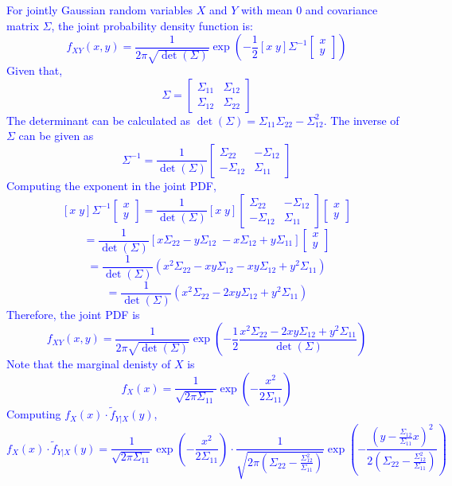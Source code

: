 \documentclass{article}
\begin{document}
\begin{enumerate}
    \textcolor{blue}{
        For jointly Gaussian random variables $X$ and $Y$ with mean 0 and covariance matrix $\Sigma$, the joint probability density function is:
$$f_{XY}(x,y) = \frac{1}{2\pi\sqrt{\det(\Sigma)}}\exp\left(-\frac{1}{2}[x \; y]\Sigma^{-1}\begin{bmatrix} x \\ y \end{bmatrix}\right)$$
Given that,
$$\Sigma = \begin{bmatrix} \Sigma_{11} & \Sigma_{12} \\ \Sigma_{12} & \Sigma_{22} \end{bmatrix}$$
The determinant can be calculated as $\det(\Sigma) = \Sigma_{11}\Sigma_{22} - \Sigma_{12}^2$.
The inverse of $\Sigma$ can be given as 
$$\Sigma^{-1} = \frac{1}{\det(\Sigma)}\begin{bmatrix} \Sigma_{22} & -\Sigma_{12} \\ -\Sigma_{12} & \Sigma_{11} \end{bmatrix}$$
Computing the exponent in the joint PDF,
$$[x \; y]\Sigma^{-1}\begin{bmatrix} x \\ y \end{bmatrix} = \frac{1}{\det(\Sigma)}[x \; y]\begin{bmatrix} \Sigma_{22} & -\Sigma_{12} \\ -\Sigma_{12} & \Sigma_{11} \end{bmatrix}\begin{bmatrix} x \\ y \end{bmatrix}$$
$$= \frac{1}{\det(\Sigma)}[x\Sigma_{22} - y\Sigma_{12} \; -x\Sigma_{12} + y\Sigma_{11}]\begin{bmatrix} x \\ y \end{bmatrix}$$
$$= \frac{1}{\det(\Sigma)}(x^2\Sigma_{22} - xy\Sigma_{12} - xy\Sigma_{12} + y^2\Sigma_{11})$$
$$= \frac{1}{\det(\Sigma)}(x^2\Sigma_{22} - 2xy\Sigma_{12} + y^2\Sigma_{11})$$
Therefore, the joint PDF is
$$f_{XY}(x,y) = \frac{1}{2\pi\sqrt{\det(\Sigma)}}\exp\left(-\frac{1}{2}\frac{x^2\Sigma_{22} - 2xy\Sigma_{12} + y^2\Sigma_{11}}{\det(\Sigma)}\right)$$
Note that the marginal denisty of $X$ is
$$f_X(x) = \frac{1}{\sqrt{2\pi\Sigma_{11}}}\exp\left(-\frac{x^2}{2\Sigma_{11}}\right)$$
Computing $f_X(x) \cdot \tilde{f}_{Y|X}(y)$,
$$f_X(x) \cdot \tilde{f}_{Y|X}(y) = \frac{1}{\sqrt{2\pi\Sigma_{11}}}\exp\left(-\frac{x^2}{2\Sigma_{11}}\right) \cdot \frac{1}{\sqrt{2\pi\left(\Sigma_{22} - \frac{\Sigma_{12}^2}{\Sigma_{11}}\right)}} \exp\left(-\frac{(y-\frac{\Sigma_{12}}{\Sigma_{11}}x)^2}{2\left(\Sigma_{22} - \frac{\Sigma_{12}^2}{\Sigma_{11}}\right)}\right)$$
}
\end{enumerate}
\end{document}
